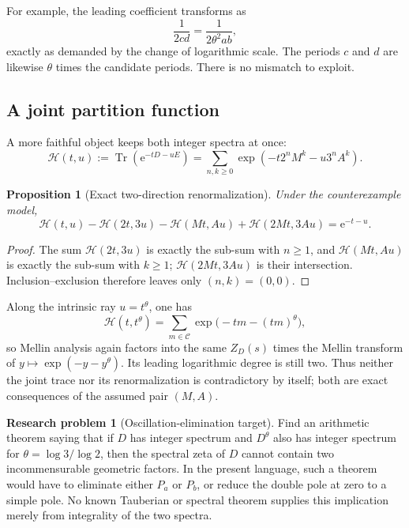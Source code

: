 \documentclass[11pt,oneside]{article}
\newtheorem{proposition}[theorem]{Proposition}
\theoremstyle{definition}
\newtheorem{problem}[theorem]{Research problem}
\theoremstyle{remark}
\newcommand{\Cand}{\mathcal C}
\newcommand{\Tr}{\operatorname{Tr}}
\newcommand{\e}{\mathrm e}
\begin{document}
For example, the leading coefficient transforms as
\[
 \frac1{2cd}=\frac1{2\theta^2ab},
\]
exactly as demanded by the change of logarithmic scale.  The periods $c$ and $d$ are likewise $\theta$ times the candidate periods.  There is no mismatch to exploit.

\subsection{A joint partition function}

A more faithful object keeps both integer spectra at once:
\begin{equation}
 \mathcal H(t,u)
 :=\Tr(\e^{-tD-uE})
 =\sum_{n,k\ge0}
   \exp(-t2^nM^k-u3^nA^k).
 \label{eq:joint-heat}
\end{equation}

\begin{proposition}[Exact two-direction renormalization]
\label{prop:joint-renormalization}
Under the counterexample model,
\begin{equation}
 \mathcal H(t,u)-\mathcal H(2t,3u)
 -\mathcal H(Mt,Au)+\mathcal H(2Mt,3Au)
 =\e^{-t-u}.
 \label{eq:joint-renormalization}
\end{equation}
\end{proposition}

\begin{proof}
The sum $\mathcal H(2t,3u)$ is exactly the sub-sum with $n\ge1$, and $\mathcal H(Mt,Au)$ is exactly the sub-sum with $k\ge1$; $\mathcal H(2Mt,3Au)$ is their intersection.  Inclusion--exclusion therefore leaves only $(n,k)=(0,0)$.
\end{proof}

Along the intrinsic ray $u=t^\theta$, one has
\[
 \mathcal H(t,t^\theta)
 =\sum_{m\in\Cand}\exp\bigl(-tm-(tm)^\theta\bigr),
\]
so Mellin analysis again factors into the same $Z_D(s)$ times the Mellin transform of $y\mapsto\exp(-y-y^\theta)$.  Its leading logarithmic degree is still two.  Thus neither the joint trace nor its renormalization is contradictory by itself; both are exact consequences of the assumed pair $(M,A)$.

\begin{problem}[Oscillation-elimination target]
Find an arithmetic theorem saying that if $D$ has integer spectrum and $D^\theta$ also has integer spectrum for $\theta=\log3/\log2$, then the spectral zeta of $D$ cannot contain two incommensurable geometric factors.  In the present language, such a theorem would have to eliminate either $P_a$ or $P_b$, or reduce the double pole at zero to a simple pole.  No known Tauberian or spectral theorem supplies this implication merely from integrality of the two spectra.
\end{problem}
\end{document}
